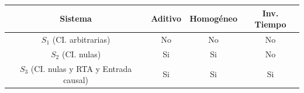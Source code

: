 \documentclass[12pt,a4paper]{report}
\begin{document}
\begin{enumerate}[label=\alph*)]

      \begin{table}[h]
        \centering
        \begin{tabular}{|c|c|c|c|}
          \hline
          \textbf{Sistema} & \textbf{Aditivo} & \textbf{Homogéneo} & \textbf{Inv. Tiempo}\\
          \hline
          $S_1$ (CI. arbitrarias) & No & No & No\\
          \hline
          $S_2$ (CI. nulas) & Si & Si & No\\
          \hline
          $S_3$ (CI. nulas y RTA y Entrada causal) & Si & Si & Si\\
          \hline
        \end{tabular}
      \end{table}


\end{enumerate}
\end{document}
